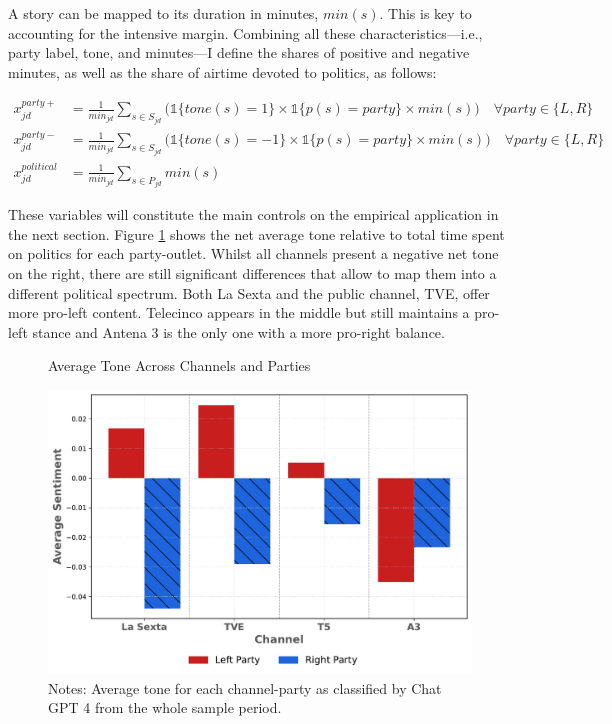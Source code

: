 \documentclass[12pt]{article}
\begin{document}
	A story can be mapped to its duration in minutes, $min(s)$. This is key to accounting for the intensive margin. Combining all these characteristics—i.e., party label, tone, and minutes—I define the shares of positive and negative minutes, as well as the share of airtime devoted to politics, as follows:
	
	


		\begin{equation}\label{eq:controls}
		\begin{aligned}
			x_{jd}^{party+}&= \frac{1}{min_{jd}} \sum_{s \in S_{jd}}\bigg(\mathds{1}\{tone(s)=1\} \times \mathds{1}\{p(s)=party\}\times min(s) \bigg) \quad \forall party \in \{L,R\} \\
			x_{jd}^{party-}&= \frac{1}{min_{jd}} \sum_{s \in S_{jd}}\bigg( \mathds{1}\{tone(s)=-1\} \times \mathds{1}\{p(s)=party\} \times min(s)\bigg) \quad \forall party \in \{L,R\} \\
			x_{jd}^{political}&=\frac{1}{min_{jd}} \sum_{s \in P_{jd}}min(s) 
		\end{aligned}
	\end{equation} 
	
	These variables will constitute the main controls on the empirical application in the next section.  Figure \ref{fig:chat} shows the net average tone relative to total time spent on politics  for each party-outlet. Whilst all channels present a negative net tone on the right, there are still significant differences that allow to map them into a different political spectrum. Both La Sexta and the public channel, TVE, offer more pro-left content. Telecinco appears in the middle but still maintains a pro-left stance and Antena 3 is the only one with a more pro-right balance. 	 
	
	

	
	\begin{figure}[ht!]
		\caption{Average Tone Across Channels and Parties}
		\centering
		\includegraphics[width=120mm]{figures/chatgpt}
		\caption*{\small Notes: Average tone for each channel-party as classified by Chat GPT 4 from the whole sample period. }
		\label{fig:chat}
	\end{figure}
	
\end{document}
